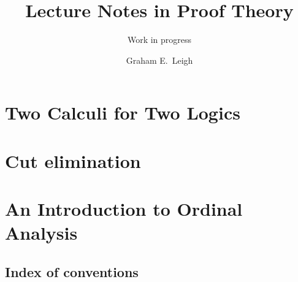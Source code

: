 \documentclass[%
	paper=174mm:247mm,
	DIV=11,
	leqno,
	titlepage,
	headsepline,
	headsepline=false,
	dynindent,
	dynnumwidth,
	toc=bib,
	toc=sectionentrywithoutdots,
	toc=chapterentrywithoutdots,
	unicode
	]%
	{scrbook}
\title{Lecture Notes in Proof Theory}
\subtitle{Work in progress}
\author{Graham E.\ Leigh}
\begin{document}
\frontmatter
\maketitle



\tableofcontents

\mainmatter



\part{Two Calculi for Two Logics}
\label{module-1}



\part{Cut elimination}
\label{module-2}





\part{An Introduction to Ordinal Analysis}
\label{module-3}





%
%
%

\backmatter


\chapter{Index of conventions}



\end{document}
